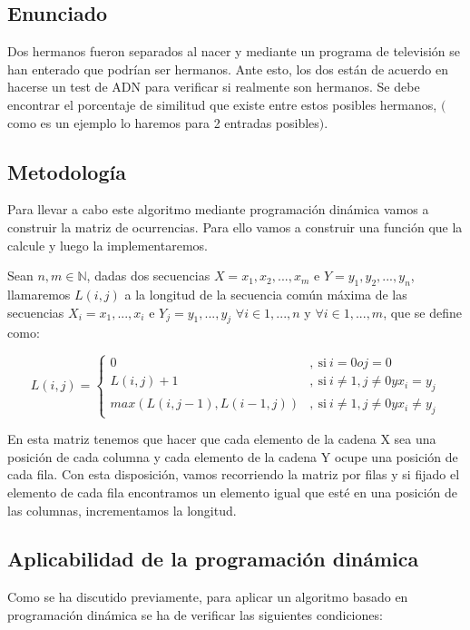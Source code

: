 \subsection{Enunciado}
Dos hermanos fueron separados al nacer y mediante un programa de televisión se han
enterado que podrían ser hermanos. Ante esto, los dos están de acuerdo en hacerse un test de
ADN para verificar si realmente son hermanos. Se debe encontrar el porcentaje de similitud que existe 
entre estos posibles hermanos, $($como es un ejemplo lo haremos para 2 entradas posibles$)$.

\subsection{Metodología}
Para llevar a cabo este algoritmo mediante programación dinámica vamos a construir la matriz de 
ocurrencias. Para ello vamos a construir una función que la calcule y luego la implementaremos.

Sean $n,m \in \mathbb{N}$, dadas dos secuencias $X = { x_1,x_2,...,x_m}$ e $Y = { y_1,y_2,...,y_n}$, llamaremos $L(i,j)$ a la 
longitud de la secuencia común máxima de las secuencias $X_i = {x_1,...,x_i}$ e $Y_j = {y_1,...,y_j}$ $\forall i \in {1,...,n} $ y $\forall i \in {1,...,m}$, 
que se define como:  

\[
  L(i,j) = 
  \left \{
    \begin{aligned}
      0 &,\ \text{si} \ i = 0 o j = 0\\
      L(i,j) + 1 &,\ \text{si} \ i \neq  1 , j \neq  0  y x_i = y_j\\
      max(L(i,j-1) , L(i-1,j))&,\ \text{si} \ i \neq 1 , j \neq 0 y x_i \neq y_j
    \end{aligned}
  \right .
\]

En esta matriz tenemos que hacer que cada elemento de la cadena X sea una posición de cada columna 
y cada elemento de la cadena Y ocupe una posición de cada fila. Con esta disposición, vamos recorriendo
la matriz por filas y si fijado el elemento de cada fila encontramos un elemento igual que esté en una 
posición de las columnas, incrementamos la longitud.

\subsection{Aplicabilidad de la programación dinámica}

Como se ha discutido previamente, para aplicar un algoritmo basado en programación
dinámica se ha de verificar las siguientes condiciones:

